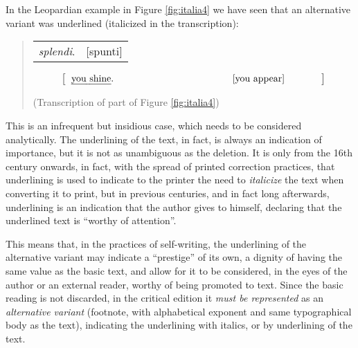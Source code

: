 \begin{paper}
In the Leopardian example in Figure \ref{fig:italia4} we have seen that an alternative variant was underlined (italicized in the transcription):

\begin{quote}
\begin{center}

\begin{tabular}{p{} p{}}
	\emph{splendi}. & [spunti] \\
\end{tabular}    
\end{center}

\begin{center}
\begin{equation*}
	\left[\begin{tabular}{p{.45\textwidth} p{.25\textwidth}}
   		\text{\emph{you shine}.} & \text{[you appear]} \\
	\end{tabular}\right]
\end{equation*}

\end{center}
\begin{flushright}
(Transcription of part of Figure \ref{fig:italia4})
\end{flushright}
\end{quote}


\noindent This is an infrequent but insidious case, which needs to be considered analytically. The underlining of the text, in fact, is always an indication of
importance, but it is not as unambiguous as the deletion. It is only
from the 16th century onwards, in fact, with the spread of printed
correction practices, that underlining is used to indicate to the
printer the need to \emph{italicize} the text when converting it to
print, but in previous centuries, and in fact long afterwards,
underlining is an indication that the author gives to himself, declaring
that the underlined text is ``worthy of attention''.

This means that, in the practices of self-writing, the underlining of
the alternative variant may indicate a ``prestige'' of its own, a dignity
of having the same value as the basic text, and allow for it to be
considered, in the eyes of the author or an external reader, worthy of
being promoted to text. Since the basic reading is not discarded, in the
critical edition it \emph{must be represented} as an \emph{alternative
variant} (footnote, with alphabetical exponent and same typographical
body as the text), indicating the underlining with italics, or by
underlining of the text.


\end{paper}
